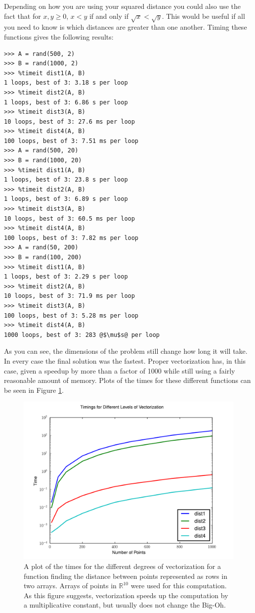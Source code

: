 Depending on how you are using your squared distance you could also use the fact that for $x, y \geq 0$, $x < y$ if and only if $\sqrt{x} < \sqrt{y}$.
This would be useful if all you need to know is which distances are greater than one another.
Timing these functions gives the following results:
\begin{lstlisting}[escapechar=\@]
>>> A = rand(500, 2)
>>> B = rand(1000, 2)
>>> %timeit dist1(A, B)
1 loops, best of 3: 3.18 s per loop
>>> %timeit dist2(A, B)
1 loops, best of 3: 6.86 s per loop
>>> %timeit dist3(A, B)
10 loops, best of 3: 27.6 ms per loop
>>> %timeit dist4(A, B)
100 loops, best of 3: 7.51 ms per loop
>>> A = rand(500, 20)
>>> B = rand(1000, 20)
>>> %timeit dist1(A, B)
1 loops, best of 3: 23.8 s per loop
>>> %timeit dist2(A, B)
1 loops, best of 3: 6.89 s per loop
>>> %timeit dist3(A, B)
10 loops, best of 3: 60.5 ms per loop
>>> %timeit dist4(A, B)
100 loops, best of 3: 7.82 ms per loop
>>> A = rand(50, 200)
>>> B = rand(100, 200)
>>> %timeit dist1(A, B)
1 loops, best of 3: 2.29 s per loop
>>> %timeit dist2(A, B)
10 loops, best of 3: 71.9 ms per loop
>>> %timeit dist3(A, B)
100 loops, best of 3: 5.28 ms per loop
>>> %timeit dist4(A, B)
1000 loops, best of 3: 283 @$\mu$s@ per loop
\end{lstlisting}
As you can see, the dimensions of the problem still change how long it will take.
In every case the final solution was the fastest.
Proper vectorization has, in this case, given a speedup by more than a factor of 1000 while still using a fairly reasonable amount of memory.
Plots of the times for these different functions can be seen in Figure \ref{distplot}.

\begin{figure}
\includegraphics[width=\textwidth]{distplot.pdf}
\caption{A plot of the times for the different degrees of vectorization for a function finding the distance between points represented as rows in two arrays. Arrays of points in $\mathbb{R}^{10}$ were used for this computation. As this figure suggests, vectorization speeds up the computation 
by a multiplicative constant, but usually does not change the Big-Oh.}
\label{distplot}
\end{figure}

